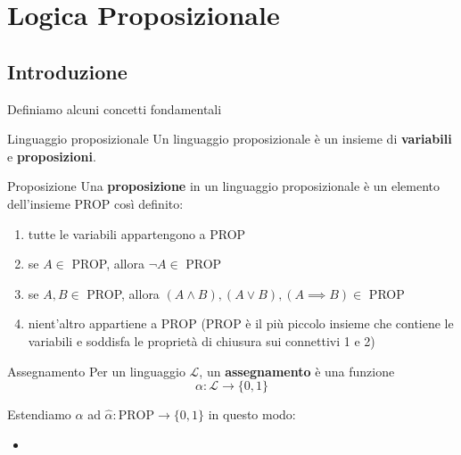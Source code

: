 \documentclass[a4paper,12pt]{report}
\begin{document}
\makefrontpage

\tableofcontents

\chapter{Logica Proposizionale}

\section{Introduzione}

Definiamo alcuni concetti fondamentali

\begin{defbox}{Linguaggio proposizionale}{}
    Un linguaggio proposizionale è un insieme di \textbf{variabili} e \textbf{proposizioni}.
\end{defbox}

\begin{defbox}{Proposizione}{}
    Una \textbf{proposizione} in un linguaggio proposizionale è un elemento dell'insieme PROP così definito:
    \begin{enumerate}
        \item tutte le variabili appartengono a PROP
        \item se \( A \in \) PROP, allora \( \neg A \in \) PROP
        \item se \( A, B \in \) PROP, allora \( (A \land B), (A \lor B), (A \implies B) \in \) PROP
        \item nient'altro appartiene a PROP {\color{gray}(PROP è il più piccolo insieme che contiene le variabili e soddisfa le proprietà di chiusura sui connettivi 1 e 2)}
    \end{enumerate}
\end{defbox}

\begin{defbox}{Assegnamento}{}
    Per un linguaggio \( \mathcal{L} \), un \textbf{assegnamento} è una funzione 
    \[
        \alpha : \mathcal{L} \to \{0, 1\}
    \]

    Estendiamo \( \alpha \) ad \( \hat{\alpha} : \text{PROP} \to \{0,1\} \) in questo modo:
    \begin{itemize}
        \item 
    \end{itemize}

    
\end{defbox}
\end{document}
